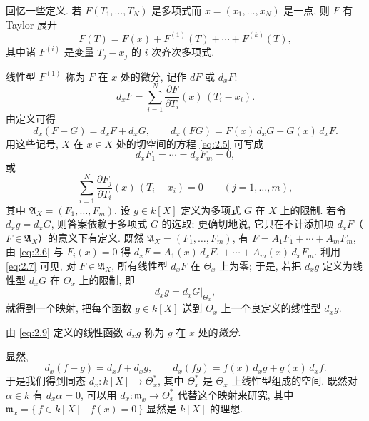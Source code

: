 回忆一些定义. 若 $F(T_1, \ldots, T_N)$ 是多项式而 $x = (x_1, \ldots, x_N)$ 是一点, 则 $F$ 有 Taylor 展开
\[
	F(T) = F(x) + F^{(1)}(T) + \cdots + F^{(k)}(T),
\]
其中诸 $F^{(i)}$ 是变量 $T_j - x_j$ 的 $i$ 次齐次多项式.

线性型 $F^{(1)}$ 称为 $F$ 在 $x$ 处的微分, 记作 $dF$ 或 $d_x F$:
\[
	d_x F = \sum_{i=1}^{N} \frac{\partial F}{\partial T_i}(x)\,(T_i - x_i).
\]
由定义可得
\begin{equation}
	\label{eq:2.6}
	d_x(F + G) = d_x F + d_x G, \qquad d_x(FG) = F(x)\, d_x G + G(x)\, d_x F.
\end{equation}
用这些记号, $X$ 在 $x \in X$ 处的切空间的方程 \eqref{eq:2.5} 可写成
\begin{equation}
	\label{eq:2.7}
	d_x F_1 = \cdots = d_x F_m = 0,
\end{equation}
或
\begin{equation}
	\label{eq:2.8}
	\sum_{i=1}^{N} \frac{\partial F_j}{\partial T_i}(x)\, (T_i - x_i) = 0 \qquad (j = 1, \ldots, m),
\end{equation}
其中 $\mathfrak A_X = (F_1, \ldots, F_m)$. 设 $g \in k[X]$ 定义为多项式 $G$ 在 $X$ 上的限制. 若令 $d_x g = d_x G$, 则答案依赖于多项式 $G$ 的选取; 更确切地说, 它只在不计添加项 $d_x F$（$F \in \mathfrak A_X$）的意义下有定义. 既然 $\mathfrak A_X = (F_1, \ldots, F_m)$, 有 $F = A_1 F_1 + \cdots + A_m F_m$, 由 \eqref{eq:2.6} 与 $F_i(x) = 0$ 得 $d_x F = A_1(x)\, d_x F_1 + \cdots + A_m(x)\, d_x F_m$. 利用 \eqref{eq:2.7} 可见, 对 $F \in \mathfrak A_X$, 所有线性型 $d_x F$ 在 $\Theta_x$ 上为零; 于是, 若把 $d_x g$ 定义为线性型 $d_x G$ 在 $\Theta_x$ 上的限制, 即
\begin{equation}
	\label{eq:2.9}
	d_x g = d_x G \big|_{\Theta_x},
\end{equation}
就得到一个映射, 把每个函数 $g \in k[X]$ 送到 $\Theta_x$ 上一个良定义的线性型 $d_x g$.

\begin{definition}[微分]\label{def:differential}
	由 \eqref{eq:2.9} 定义的线性函数 $d_x g$ 称为 $g$ 在 $x$ 处的\emph{微分}.
\end{definition}

显然,
\begin{equation}
	\label{eq:2.10}
	d_x(f + g) = d_x f + d_x g, \qquad d_x(fg) = f(x)\, d_x g + g(x)\, d_x f.
\end{equation}
于是我们得到同态 $d_x: k[X] \to \Theta_x^*$, 其中 $\Theta_x^*$ 是 $\Theta_x$ 上线性型组成的空间. 既然对 $\alpha \in k$ 有 $d_x \alpha = 0$, 可以用 $d_x: \mathfrak m_x \to \Theta_x^*$ 代替这个映射来研究, 其中 $\mathfrak m_x = \{\, f \in k[X] \mid f(x) = 0 \,\}$ 显然是 $k[X]$ 的理想.

